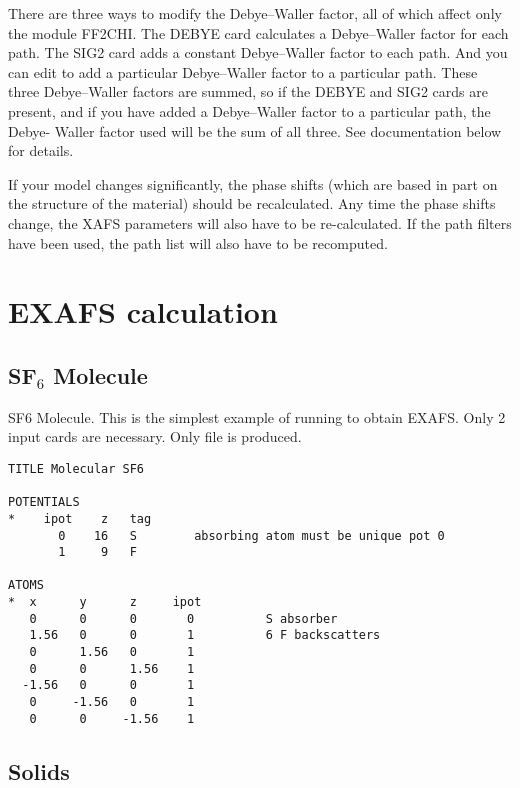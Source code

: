 \documentclass[11pt,oneside]{report} %
\begin{document}
There are three ways to modify the Debye--Waller factor, all of which affect
only the module FF2CHI.  The DEBYE card
calculates a Debye--Waller factor for each path.  The SIG2 card adds
a constant Debye--Waller factor to each path.  And you can edit 
to add a particular Debye--Waller factor to a particular path.  These three
Debye--Waller factors are summed, so if the DEBYE and SIG2 cards are present,
and if you have added a Debye--Waller factor to a particular path, the Debye-
Waller factor used will be the sum of all three.  See documentation below
for details.

If your model changes significantly, the phase shifts (which are based
in part on the structure of the material) should be recalculated.
Any time the phase shifts change, the XAFS parameters will also have to be
re-calculated.  If the path filters have been used, the path list will
also have to be recomputed.




\section{EXAFS calculation}
\label{sec:EXAFS-calculation}





\subsection{SF$_6$ Molecule}
\label{sec:Molecule}


SF6 Molecule. This is the simplest example of running {\feff} to obtain
EXAFS.  Only 2 input cards are necessary. Only  file is
produced.

\begin{verbatim}
TITLE Molecular SF6

POTENTIALS
*    ipot    z   tag
       0    16   S        absorbing atom must be unique pot 0
       1     9   F

ATOMS
*  x      y      z     ipot
   0      0      0       0          S absorber
   1.56   0      0       1          6 F backscatters
   0      1.56   0       1
   0      0      1.56    1
  -1.56   0      0       1
   0     -1.56   0       1
   0      0     -1.56    1
\end{verbatim}




\subsection{Solids}
\label{sec:Solid}
\end{document}
